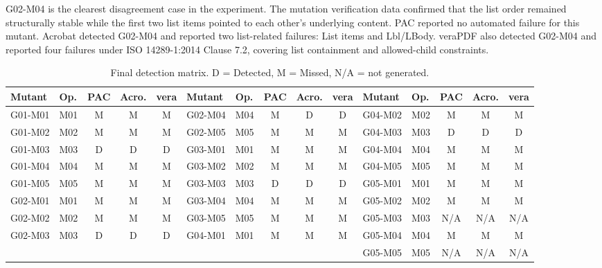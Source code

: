 \documentclass[conference]{IEEEtran}
\newcommand{\detected}{D}
\newcommand{\missed}{M}
\newcommand{\na}{N/A}
\begin{document}
G02-M04 is the clearest disagreement case in the experiment. The mutation verification data confirmed that the list order remained structurally stable while the first two list items pointed to each other's underlying content. PAC reported no automated failure for this mutant. Acrobat detected G02-M04 and reported two list-related failures: List items and Lbl/LBody. veraPDF also detected G02-M04 and reported four failures under ISO 14289-1:2014 Clause 7.2, covering list containment and allowed-child constraints.

\begin{table}[t]
\caption{Final detection matrix. D = Detected, M = Missed, N/A = not generated.}
\label{tab:matrix}
\centering
\small
\begin{tabular}{llccc|llccc|llccc}
\toprule
Mutant & Op. & PAC & Acro. & vera & Mutant & Op. & PAC & Acro. & vera & Mutant & Op. & PAC & Acro. & vera \\
\midrule
G01-M01 & M01 & \missed & \missed & \missed & G02-M04 & M04 & \missed & \detected & \detected & G04-M02 & M02 & \missed & \missed & \missed \\
G01-M02 & M02 & \missed & \missed & \missed & G02-M05 & M05 & \missed & \missed & \missed & G04-M03 & M03 & \detected & \detected & \detected \\
G01-M03 & M03 & \detected & \detected & \detected & G03-M01 & M01 & \missed & \missed & \missed & G04-M04 & M04 & \missed & \missed & \missed \\
G01-M04 & M04 & \missed & \missed & \missed & G03-M02 & M02 & \missed & \missed & \missed & G04-M05 & M05 & \missed & \missed & \missed \\
G01-M05 & M05 & \missed & \missed & \missed & G03-M03 & M03 & \detected & \detected & \detected & G05-M01 & M01 & \missed & \missed & \missed \\
G02-M01 & M01 & \missed & \missed & \missed & G03-M04 & M04 & \missed & \missed & \missed & G05-M02 & M02 & \missed & \missed & \missed \\
G02-M02 & M02 & \missed & \missed & \missed & G03-M05 & M05 & \missed & \missed & \missed & G05-M03 & M03 & \na & \na & \na \\
G02-M03 & M03 & \detected & \detected & \detected & G04-M01 & M01 & \missed & \missed & \missed & G05-M04 & M04 & \missed & \missed & \missed \\
 & & & & & & & & & & G05-M05 & M05 & \na & \na & \na \\
\bottomrule
\end{tabular}
\end{table}
\end{document}
